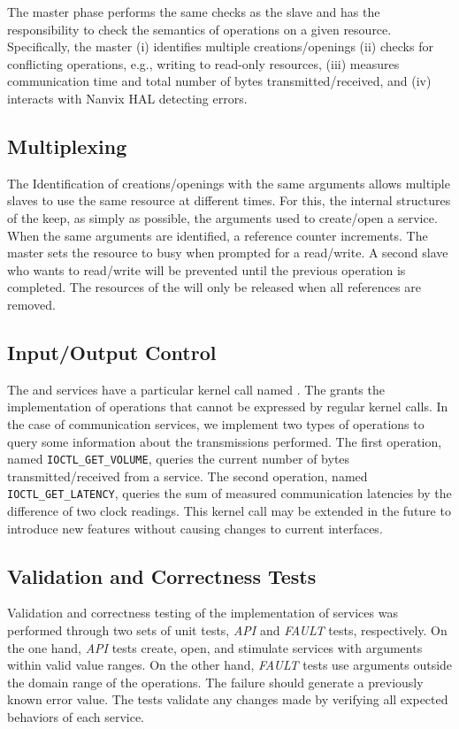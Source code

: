 			The master phase performs the same checks as the slave and has the
			responsibility to check the semantics of operations on a given resource.
			Specifically, the master
			(i) identifies multiple creations/openings
			(ii) checks for conflicting operations, e.g., writing to read-only resources,
			(iii) measures communication time and total number of bytes transmitted/received, and
			(iv) interacts with Nanvix HAL detecting errors.

		\subsection{Multiplexing}

			The Identification of creations/openings with the same arguments
			allows multiple slaves to use the same resource at different times.
			For this, the internal structures of the \os keep, as simply as possible,
			the arguments used to create/open a service. When the same arguments are
			identified, a reference counter increments. The master sets the resource
			to busy when prompted for a read/write. A second slave who wants to read/write
			 will be prevented until the previous operation is completed. The resources
			 of the \hal will only be released when all references are removed.

		\subsection{Input/Output Control}

			The \mailbox and \portal services have a particular kernel
			call named
			\ioctl. The \ioctl grants the implementation of operations that cannot be
			expressed by regular kernel calls. In the case of communication services,
			we implement two types of operations to query some
			information about the
			transmissions performed. The first operation, named \texttt{IOCTL\_GET\_VOLUME},
			queries the current number of bytes transmitted/received from a service.
			The second operation, named \texttt{IOCTL\_GET\_LATENCY}, queries the sum
			of measured communication latencies by the difference of two clock readings.
			This kernel call may be extended in the future to introduce new features
			without causing changes to current interfaces.

		\subsection{Validation and Correctness Tests}

			Validation and correctness testing of the implementation of services was
			performed through two sets of unit tests, \textit{API} and \textit{FAULT}
			tests, respectively. On the one hand, \textit{API} tests create, open, and
			stimulate services with arguments within valid value ranges. On the other
			hand, \textit{FAULT} tests use arguments outside the domain range of the
			operations. The failure should generate a previously known error value.
			The tests validate any changes made by verifying all expected behaviors
			of each service.
